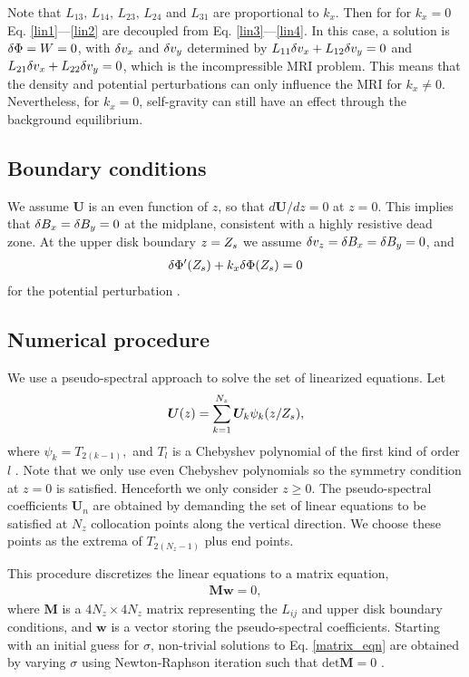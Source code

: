 Note that $L_{13},\,L_{14},\,L_{23},\,L_{24}$ and $L_{31}$ are
proportional to $k_x$. Then for for $k_x=0$ 
Eq. \ref{lin1}---\ref{lin2} are decoupled from 
Eq. \ref{lin3}---\ref{lin4}. In this case, a solution is $\delta \Phi=W=0$,
with $\delta v_x$ and $\delta v_y$ determined by $L_{11}\delta v_x + L_{12}\delta v_y = 0$ and 
$L_{21}\delta v_x + L_{22}\delta v_y=0$, which is the incompressible MRI problem. 
This means that the density and potential perturbations can only
influence the MRI for $k_x\neq0$. Nevertheless, for $k_x=0$,
self-gravity can still have an effect through the background
equilibrium.  

\subsection{Boundary conditions}
We assume $\bm{U}$ is an even function of $z$, so that $d\bm{U}/dz=0$
at $z=0$. This implies that $\delta B_x=\delta B_y=0$ at the midplane, consistent
with a highly resistive dead zone. At the upper disk boundary
$z=Z_s$ we assume 
$\delta v_z=\delta B_x=\delta B_y=0$, and 
\begin{align}
  \delta \Phi^\prime(Z_s) + k_x\delta \Phi(Z_s) = 0
\end{align}
for the potential perturbation \citep[see][]{goldreich65a}.  

\subsection{Numerical procedure}
We use a pseudo-spectral approach to solve the set of linearized
equations. Let
\begin{align}\label{cheby_expand}
  \bm{U}(z) 
  = \sum_{k=1}^{N_z} \bm{U}_k\psi_k(z/Z_s), 
\end{align}
where $  \psi_k  = T_{2(k-1)},  $ and  $T_l$ is a Chebyshev polynomial of the first
kind of order $l$ \citep{stegun65}. %
Note that we only use even Chebyshev polynomials so the symmetry 
condition at $z=0$ is satisfied. Henceforth we only consider $z\geq 0$. 
The pseudo-spectral coefficients $\bm{U}_n$  are obtained by demanding
the set of linear equations to be satisfied at $N_z$ collocation
points along the vertical direction. We choose these points as the
extrema of $T_{2(N_z-1)}$ plus end points. 

This procedure discretizes the linear equations to a matrix equation,
\begin{align}\label{matrix_eqn}
\bm{M}\bm{w} = 0, 
\end{align}
where $\bm{M}$ is a $4N_z\times 4 N_z$ matrix representing the $L_{ij}$ 
and upper disk boundary conditions, 
and $\bm{w}$ is a vector storing the pseudo-spectral coefficients. 
Starting with an initial guess for $\sigma$, non-trivial solutions to
Eq. \ref{matrix_eqn} are obtained by varying $\sigma$ using Newton-Raphson iteration 
such that $\mathrm{det}\bm{M}=0$ \citep[details can be found in][]{lin12}.

